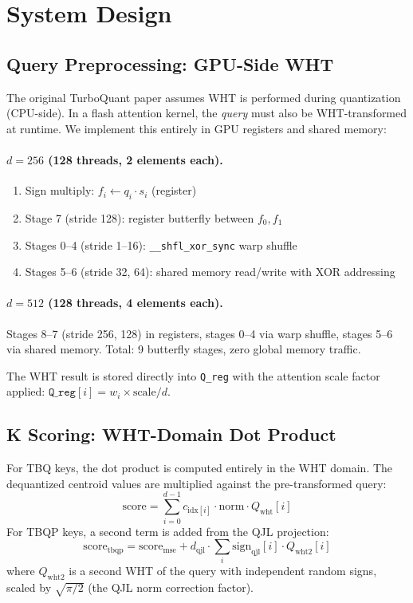 \documentclass[10pt,twocolumn]{article}
\begin{document}
\section{System Design}
\label{sec:design}

\subsection{Query Preprocessing: GPU-Side WHT}

The original TurboQuant paper assumes WHT is performed during quantization (CPU-side). In a flash attention kernel, the \emph{query} must also be WHT-transformed at runtime. We implement this entirely in GPU registers and shared memory:

\paragraph{$d=256$ (128 threads, 2 elements each).}
\begin{enumerate}[leftmargin=*,topsep=2pt,itemsep=1pt]
\item Sign multiply: $f_i \leftarrow q_i \cdot s_i$ (register)
\item Stage 7 (stride 128): register butterfly between $f_0, f_1$
\item Stages 0--4 (stride 1--16): \texttt{\_\_shfl\_xor\_sync} warp shuffle
\item Stages 5--6 (stride 32, 64): shared memory read/write with XOR addressing
\end{enumerate}

\paragraph{$d=512$ (128 threads, 4 elements each).}
Stages 8--7 (stride 256, 128) in registers, stages 0--4 via warp shuffle, stages 5--6 via shared memory. Total: 9 butterfly stages, zero global memory traffic.

The WHT result is stored directly into \texttt{Q\_reg} with the attention scale factor applied: $\texttt{Q\_reg}[i] = w_i \times \text{scale} / d$.

\subsection{K Scoring: WHT-Domain Dot Product}

For TBQ keys, the dot product is computed entirely in the WHT domain. The dequantized centroid values are multiplied against the pre-transformed query:
\begin{equation}
\text{score} = \sum_{i=0}^{d-1} c_{\text{idx}[i]} \cdot \text{norm} \cdot Q_{\text{wht}}[i]
\end{equation}
For TBQP keys, a second term is added from the QJL projection:
\begin{equation}
\text{score}_\text{tbqp} = \text{score}_\text{mse} + d_\text{qjl} \cdot \sum_{i} \text{sign}_\text{qjl}[i] \cdot Q_{\text{wht2}}[i]
\end{equation}
where $Q_{\text{wht2}}$ is a second WHT of the query with independent random signs, scaled by $\sqrt{\pi/2}$ (the QJL norm correction factor).
\end{document}
